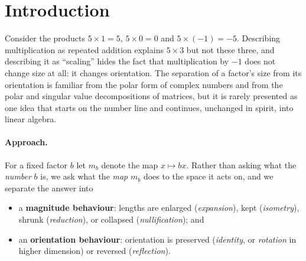 \documentclass[12pt]{article}
\theoremstyle{definition}
\theoremstyle{remark}
\begin{document}
\section{Introduction}\label{sec:intro}
Consider the products $5\times 1=5$, $5\times 0=0$ and $5\times(-1)=-5$. Describing multiplication as repeated addition explains $5\times 3$ but not these three, and describing it as ``scaling'' hides the fact that multiplication by $-1$ does not change size at all: it changes orientation. The separation of a factor's size from its orientation is familiar from the polar form of complex numbers and from the polar and singular value decompositions of matrices, but it is rarely presented as one idea that starts on the number line and continues, unchanged in spirit, into linear algebra.

\paragraph{Approach.}
For a fixed factor $b$ let $m_b$ denote the map $x\mapsto bx$. Rather than asking what the \emph{number} $b$ is, we ask what the \emph{map} $m_b$ does to the space it acts on, and we separate the answer into
\begin{itemize}
  \item a \textbf{magnitude behaviour}: lengths are enlarged (\emph{expansion}), kept (\emph{isometry}), shrunk (\emph{reduction}), or collapsed (\emph{nullification}); and
  \item an \textbf{orientation behaviour}: orientation is preserved (\emph{identity}, or \emph{rotation} in higher dimension) or reversed (\emph{reflection}).
\end{itemize}
\end{document}
